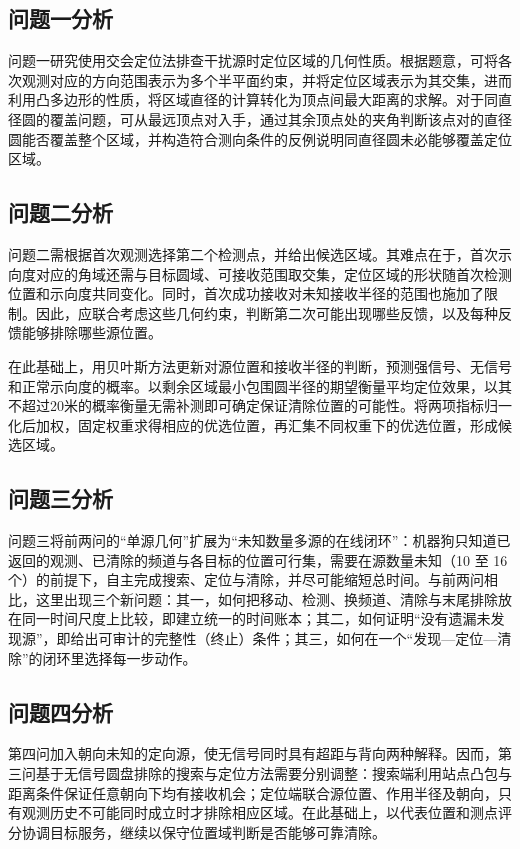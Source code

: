 \documentclass[UTF8,a4paper,zihao=-4,fontset=none]{ctexart}
\begin{document}
\subsection{问题一分析}

问题一研究使用交会定位法排查干扰源时定位区域的几何性质。根据题意，可将各次观测对应的方向范围表示为多个半平面约束，并将定位区域表示为其交集，进而利用凸多边形的性质，将区域直径的计算转化为顶点间最大距离的求解。对于同直径圆的覆盖问题，可从最远顶点对入手，通过其余顶点处的夹角判断该点对的直径圆能否覆盖整个区域，并构造符合测向条件的反例说明同直径圆未必能够覆盖定位区域。

\subsection{问题二分析}

问题二需根据首次观测选择第二个检测点，并给出候选区域。其难点在于，首次示向度对应的角域还需与目标圆域、可接收范围取交集，定位区域的形状随首次检测位置和示向度共同变化。同时，首次成功接收对未知接收半径的范围也施加了限制。因此，应联合考虑这些几何约束，判断第二次可能出现哪些反馈，以及每种反馈能够排除哪些源位置。

在此基础上，用贝叶斯方法更新对源位置和接收半径的判断，预测强信号、无信号和正常示向度的概率。以剩余区域最小包围圆半径的期望衡量平均定位效果，以其不超过20米的概率衡量无需补测即可确定保证清除位置的可能性。将两项指标归一化后加权，固定权重求得相应的优选位置，再汇集不同权重下的优选位置，形成候选区域。

\subsection{问题三分析}

问题三将前两问的“单源几何”扩展为“未知数量多源的在线闭环”：机器狗只知道已返回的观测、已清除的频道与各目标的位置可行集，需要在源数量未知（10 至 16 个）的前提下，自主完成搜索、定位与清除，并尽可能缩短总时间。与前两问相比，这里出现三个新问题：其一，如何把移动、检测、换频道、清除与末尾排除放在同一时间尺度上比较，即建立统一的时间账本；其二，如何证明“没有遗漏未发现源”，即给出可审计的完整性（终止）条件；其三，如何在一个“发现—定位—清除”的闭环里选择每一步动作。

\subsection{问题四分析}

第四问加入朝向未知的定向源，使无信号同时具有超距与背向两种解释。因而，第三问基于无信号圆盘排除的搜索与定位方法需要分别调整：搜索端利用站点凸包与距离条件保证任意朝向下均有接收机会；定位端联合源位置、作用半径及朝向，只有观测历史不可能同时成立时才排除相应区域。在此基础上，以代表位置和测点评分协调目标服务，继续以保守位置域判断是否能够可靠清除。
\end{document}
